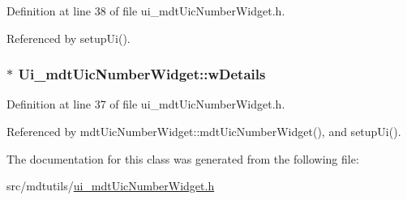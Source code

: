 Definition at line 38 of file ui\-\_\-mdt\-Uic\-Number\-Widget.\-h.



Referenced by setup\-Ui().

\hypertarget{class_ui__mdt_uic_number_widget_a30c1416cee780b360ebf6b1e48e4246c}{
\subsubsection[{w\-Details}]{$\ast$ Ui\-\_\-mdt\-Uic\-Number\-Widget\-::w\-Details}}\label{class_ui__mdt_uic_number_widget_a30c1416cee780b360ebf6b1e48e4246c}


Definition at line 37 of file ui\-\_\-mdt\-Uic\-Number\-Widget.\-h.



Referenced by mdt\-Uic\-Number\-Widget\-::mdt\-Uic\-Number\-Widget(), and setup\-Ui().



The documentation for this class was generated from the following file\-:\begin{DoxyCompactItemize}
\item 
src/mdtutils/\hyperlink{ui__mdt_uic_number_widget_8h}{ui\-\_\-mdt\-Uic\-Number\-Widget.\-h}\end{DoxyCompactItemize}
